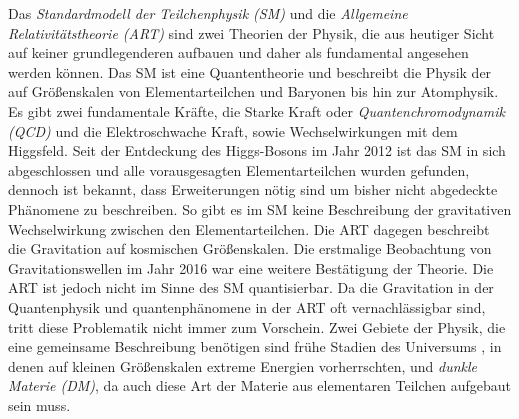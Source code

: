 %   

Das \textit{Standardmodell der Teilchenphysik (SM)} und die 
\textit{Allgemeine Relativitätstheorie (ART)} sind zwei Theorien der 
Physik, die aus heutiger Sicht auf keiner grundlegenderen aufbauen und 
daher als fundamental angesehen werden können. Das SM ist eine Quantentheorie 
und beschreibt die Physik der auf Größenskalen von Elementarteilchen und 
Baryonen bis hin zur Atomphysik. Es gibt zwei fundamentale Kräfte, 
die Starke Kraft oder \textit{Quantenchromodynamik (QCD)} und die 
Elektroschwache Kraft, sowie Wechselwirkungen mit dem Higgsfeld. Seit 
der Entdeckung des Higgs-Bosons im Jahr 2012 \cite{Higgs} ist das SM in sich 
abgeschlossen und alle vorausgesagten Elementarteilchen wurden gefunden, 
dennoch ist bekannt, dass Erweiterungen nötig sind um bisher nicht abgedeckte 
Phänomene zu beschreiben. So gibt es im SM keine Beschreibung der gravitativen 
Wechselwirkung zwischen den Elementarteilchen. Die ART dagegen beschreibt die 
Gravitation auf kosmischen Größenskalen. Die erstmalige Beobachtung von 
Gravitationswellen im Jahr 2016 \cite{gravitational_waves} war eine weitere 
Bestätigung der Theorie. Die ART ist jedoch nicht im Sinne des SM 
quantisierbar. Da die Gravitation in der Quantenphysik und quantenphänomene 
in der ART oft vernachlässigbar sind, tritt diese Problematik nicht immer zum 
Vorschein. Zwei Gebiete der Physik, die eine gemeinsame 
Beschreibung benötigen sind frühe Stadien des Universums 
\cite{GR_Introductory}, in denen auf kleinen 
Größenskalen extreme Energien vorherrschten, und \textit{dunkle Materie (DM)}, 
da auch diese Art der Materie aus elementaren Teilchen aufgebaut sein muss. 

